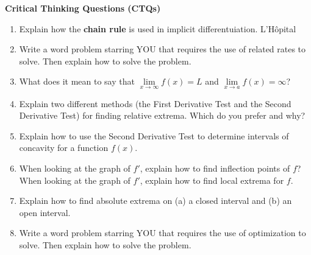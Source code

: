 \documentclass[12pt]{article}
\begin{document}
\textbf{Critical Thinking Questions (CTQs)}


\begin{enumerate}
\setlength\itemsep{1em}
\item Explain how the \textbf{chain rule} is used in implicit differentuiation.  L'H\^{o}pital
\item Write a word problem starring YOU that requires the use of related rates to solve. Then explain how to solve the problem. 
\item What does it mean to say that $\lim\limits_{x \to \infty}f(x)=L$ and $\lim\limits_{x \to a}f(x)=\infty$?
\item Explain two different methods (the First Derivative Test and the Second Derivative Test) for finding relative extrema. Which do you prefer and why?
\item Explain how to use the Second Derivative Test to determine intervals of concavity for a function $f(x)$.
\item When looking at the graph of $f'$, explain how to find inflection points of $f$? When looking at the graph of $f'$, explain how to find local extrema for $f$.
\item Explain how to find absolute extrema on (a) a closed interval and (b) an open interval.
\item Write a word problem starring YOU that requires the use of optimization to solve. Then explain how to solve the problem.
\end{enumerate}
\end{document}

